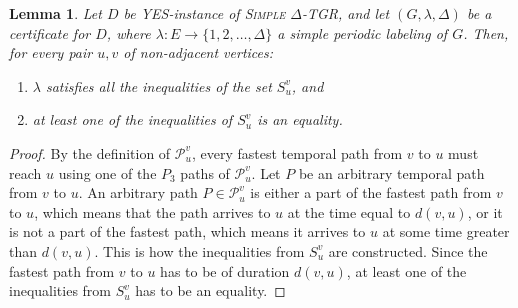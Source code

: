 \documentclass[11pt,a4paper]{article}
\newtheorem{lemma}[theorem]{Lemma}
\theoremstyle{remark}
\theoremstyle{definition}
\begin{document}
	\begin{lemma}
	\label{claim:exact-setsOfInequalities}
    Let $D$ be \textsc{YES}-instance of \textsc{Simple $\Delta$-TGR}, and let 
$(G,\lambda,\Delta)$ be a certificate for $D$, where $\lambda:E\rightarrow \{1,2,\ldots,\Delta\}$ a simple periodic labeling of $G$. Then, for every pair $u,v$ of non-adjacent vertices:
	\begin{enumerate}
	    \item \label{itemize:Claim-exact-AtLeastOneEquality-1} $\lambda$ satisfies all the inequalities of the set $S_u^v$, and 
	    \item \label{itemize:Claim-exact-AtLeastOneEquality} at least one of the inequalities of $S_u^v$ is an equality.
	\end{enumerate}
	\end{lemma}

    \begin{proof}
    By the definition of $\mathcal{P}_u^v$, every fastest temporal path from $v$ to $u$ must reach $u$ using one of the $P_3$ paths of $\mathcal{P}_u^v$.
    Let $P$ be an arbitrary temporal path from $v$ to $u$. 
    An arbitrary path $P \in \mathcal{P}_u^v$ is either a part of the fastest path from $v$ to $u$, which means that the path arrives to $u$ at the time equal to $d(v,u)$,
    or it is not a part of the fastest path, which means it arrives to $u$ at some time greater than $d(v,u)$.
    This is how the inequalities from $S_u^v$ are constructed. 
    Since the fastest path from $v$ to $u$ has to be of duration $d(v,u)$, at least one of the inequalities from $S_u^v$ has to be an equality.    
    \end{proof}
    
    
\end{document}
